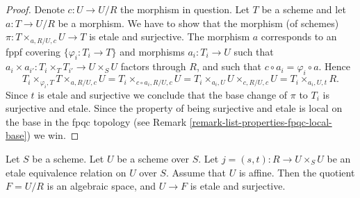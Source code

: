 \begin{proof}
Denote $c : U \to U/R$ the morphism in question.
Let $T$ be a scheme and let $a : T \to U/R$ be a morphism.
We have to show that the morphism (of schemes)
$\pi : T \times_{a, R/U, c} U \to T$ is etale and surjective.
The morphism $a$ corresponds to an fppf covering
$\{\varphi_i : T_i \to T\}$ and morphisms $a_i : T_i \to U$ such
that
$a_i \times a_{i'} : T_i \times_T T_{i'} \to U\times_S U$
factors through $R$, and such that $c \circ a_i = \varphi_i \circ a$.
Hence
$$
T_i \times_{\varphi_i, T} T \times_{a, R/U, c} U =
T_i \times_{c \circ a_i, R/U, c} U =
T_i \times_{a_i, U} U \times_{c, R/U, c} U = T_i \times_{a_i, U, t} R.
$$
Since $t$ is etale and surjective we conclude that
the base change of $\pi$ to $T_i$ is surjective and etale.
Since the property of being surjective and etale is local
on the base in the fpqc topology (see
Remark \ref{remark-list-properties-fpqc-local-base})
we win.
\end{proof}

\begin{lemma}
\label{lemma-presentation-quasi-compact}
Let $S$ be a scheme.
Let $U$ be a scheme over $S$.
Let $j = (s, t) : R \to U \times_S U$
be an etale equivalence relation on $U$ over $S$.
Assume that $U$ is affine. Then the quotient $F = U/R$
is an algebraic space, and $U \to F$ is etale and surjective.
\end{lemma}

